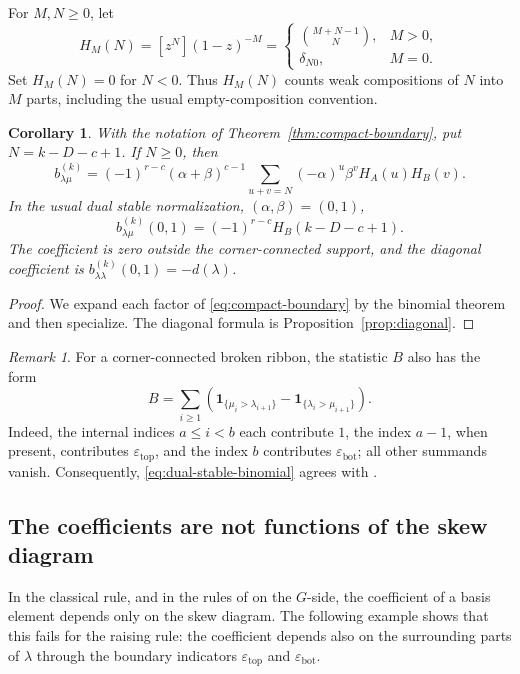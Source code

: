 \documentclass[11pt]{amsart}
\numberwithin{equation}{section}
\newtheorem{corollary}[theorem]{Corollary}
\theoremstyle{definition}
\theoremstyle{remark}
\newtheorem{remark}[theorem]{Remark}
\newcommand{\ind}{\mathbf 1}
\begin{document}
For $M,N\geq0$, let
\[
 H_M(N)=[z^N](1-z)^{-M}
 =\begin{cases}
 \binom{M+N-1}{N},&M>0,\\
 \delta_{N0},&M=0.
 \end{cases}
\]
Set $H_M(N)=0$ for $N<0$. Thus $H_M(N)$ counts weak compositions of
$N$ into $M$ parts, including the usual empty-composition convention.

\begin{corollary}\label{cor:compact-binomial}
With the notation of Theorem~\ref{thm:compact-boundary}, put
$N=k-D-c+1$. If $N\geq0$, then
\[
 b^{(k)}_{\lambda\mu}
 =(-1)^{r-c}(\alpha+\beta)^{c-1}
 \sum_{u+v=N}(-\alpha)^u\beta^v H_A(u)H_B(v).
\]
In the usual dual stable normalization, $(\alpha,\beta)=(0,1)$,
\begin{equation}\label{eq:dual-stable-binomial}
 b^{(k)}_{\lambda\mu}(0,1)=(-1)^{r-c}H_B(k-D-c+1).
\end{equation}
The coefficient is zero outside the corner-connected support, and the
diagonal coefficient is $b^{(k)}_{\lambda\lambda}(0,1)=-d(\lambda)$.
\end{corollary}

\begin{proof}
We expand each factor of \eqref{eq:compact-boundary} by the binomial
theorem and then specialize. The diagonal formula is
Proposition~\ref{prop:diagonal}.
\end{proof}

\begin{remark}
For a corner-connected broken ribbon, the statistic $B$ also
has the form
\[
 B=\sum_{i\geq1}
 \left(
   \ind_{\{\mu_i>\lambda_{i+1}\}}
   -\ind_{\{\lambda_i>\mu_{i+1}\}}
 \right).
\]
Indeed, the internal indices $a\leq i<b$ each contribute $1$,
the index $a-1$, when present, contributes
$\varepsilon_{\mathrm{top}}$, and the index $b$ contributes
$\varepsilon_{\mathrm{bot}}$; all other summands vanish.
Consequently, \eqref{eq:dual-stable-binomial} agrees with
\cite[Thm.~2.1]{HiepThuy}.
\end{remark}

\subsection{The coefficients are not functions of the skew diagram}

In the classical rule, and in the rules of \cite{NHST,Kundu} on the
$G$-side, the coefficient of a basis element depends only on the skew
diagram. The following example shows that this fails for the raising
rule: the coefficient depends also on the surrounding parts of $\lambda$
through the boundary indicators $\varepsilon_{\mathrm{top}}$ and
$\varepsilon_{\mathrm{bot}}$.
\end{document}
